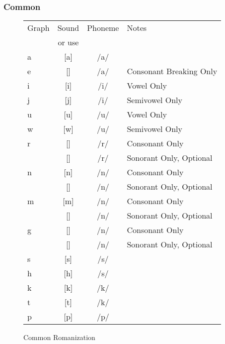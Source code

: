 \documentclass[11pt,letterpaper]{article}
\makeatletter
\newcommand{\epsi}{\textipa{E}}
\newcommand{\engma}{\textipa{N}}
\newcommand{\rson}{\textipa{@}\textrhoticity}
\newcommand{\flap}{\textipa{R}}
\newcommand{\nson}{\s{n}}
\newcommand{\mson}{\s{m}}
\newcommand{\engson}{\s{\engma}}
\makeatother
\begin{document}
		\subsubsection{Common}
		\begin{wrapfigure}{l}{0.575\textwidth}
  			\begin{tabular}{|l|c|c|l|}
  				\hline
  				Graph      & Sound     & Phoneme & Notes\\
  				           & or use    &         &      \\ \hline \hline
  				\textlangle{}a\textrangle{}        & [a]       & /a/     &      \\
  				\textlangle{}e\textrangle{}        & [\epsi]   & /a/     & Consonant Breaking Only \\
  				\textlangle{}i\textrangle{}        & [i]       & /i/     & Vowel Only \\
  				\textlangle{}j\textrangle{}        & [j]       & /i/     & Semivowel Only \\
  				\textlangle{}u\textrangle{}        & [u]       & /u/     & Vowel Only \\
  				\textlangle{}w\textrangle{}        & [w]       & /u/     & Semivowel Only \\
  				\textlangle{}r\textrangle{}        & [\flap]   & /r/     & Consonant Only \\
  				\textlangle{}\s{r}\textrangle{}    & [\rson]   & /r/     & Sonorant Only, Optional \\
				\textlangle{}n\textrangle{}        & [n]       & /n/     & Consonant Only \\
				\textlangle{}\nson\textrangle{}    & [\nson]   & /n/     & Sonorant Only, Optional \\ 
				\textlangle{}m\textrangle{}        & [m]       & /n/     & Consonant Only \\
				\textlangle{}\mson\textrangle{}    & [\mson]   & /n/     & Sonorant Only, Optional \\ 				
				\textlangle{}g\textrangle{}        & [\engma]  & /n/     & Consonant Only \\
				\textlangle{}\s{g}\textrangle{}    & [\engson] & /n/     & Sonorant Only, Optional \\
				\textlangle{}s\textrangle{}        & [s]       & /s/     &   \\
				\textlangle{}h\textrangle{}        & [h]       & /s/     &   \\
				\textlangle{}k\textrangle{}        & [k]       & /k/     &   \\
				\textlangle{}t\textrangle{}        & [t]       & /k/     &   \\ 
  				\textlangle{}p\textrangle{}        & [p]       & /p/     &   \\ \hline        
  			\end{tabular}
  			\caption{Common Romanization}
		\end{wrapfigure}
\end{document}
